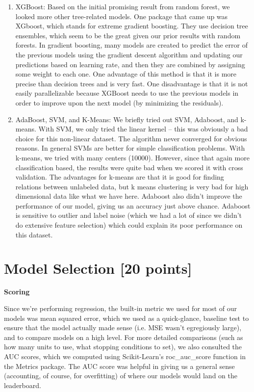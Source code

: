 \begin{enumerate}
\item XGBoost: Based on the initial promising result from random forest, we looked more other tree-related models. One package that came up was XGboost, which stands for extreme gradient boosting. They use decision tree ensembles, which seem to be the great given our prior results with random forests. In gradient boosting, many models are created to predict the error of the previous models using the gradient descent algorithm and updating our predictions based on learning rate, and then they are combined by assigning some weight to each one. One advantage of this method is that it is more precise than decision trees and is very fast. One disadvantage is that it is not easily parallelizable because XGBoost needs to use the previous models in order to improve upon the next model (by minimizing the residuals).

\item AdaBoost, SVM, and K-Means: We briefly tried out SVM, Adaboost, and k-means. With SVM, we only tried the linear kernel -- this was obviously a bad choice for this non-linear dataset. The algorithm never converged for obvious reasons. In general SVMs are better for simple classification problems. With k-means, we tried with many centers (10000). However, since that again more classification based, the results were quite bad when we scored it with cross validation. The advantages for k-means are that it is good for finding relations between unlabeled data, but k means clustering is very bad for high dimensional data like what we have here. Adaboost also didn’t improve the performance of our model, giving us an accuracy just above chance. Adaboost is sensitive to outlier and label noise (which we had a lot of since we didn’t do extensive feature selection) which could explain its poor performance on this dataset.
\end{enumerate}

\newpage

\section{Model Selection [20 points]}

\vspace{2ex}

\noindent
\textbf{Scoring}

\noindent
Since we’re performing regression, the built-in metric we used for most of our models was mean squared error, which we used as a quick-glance, baseline test to ensure that the model actually made sense (i.e. MSE wasn’t egregiously large), and to compare models on a high level. For more detailed comparisons (such as how many units to use, what stopping conditions to set), we also consulted the AUC scores, which we computed using Scikit-Learn’s roc_auc_score function in the Metrics package. The AUC score was helpful in giving us a general sense (accounting, of course, for overfitting) of where our models would land on the leaderboard.

